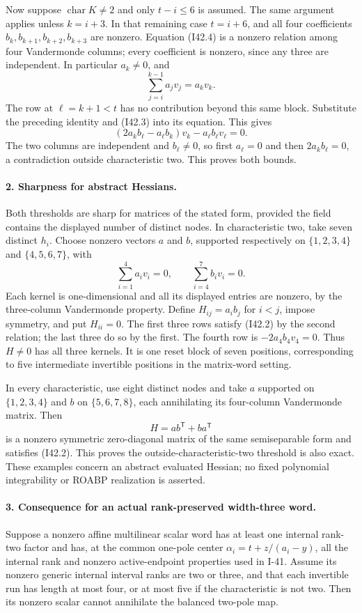 Now suppose $\operatorname{char}K\ne2$ and only $t-i\le6$
is assumed. The same argument applies unless $k=i+3$.
In that remaining case $t=i+6$, and all four coefficients
$b_k,b_{k+1},b_{k+2},b_{k+3}$ are nonzero. Equation (I42.4)
is a nonzero relation among four Vandermonde columns; every
coefficient is nonzero, since any three are independent.
In particular $a_k\ne0$, and
\[
 \sum_{j=i}^{k-1}a_jv_j=a_kv_k.
\]
The row at $\ell=k+1<t$ has no contribution beyond this same
block. Substitute the preceding identity and (I42.3) into its
equation. This gives
\[
 (2a_kb_\ell-a_\ell b_k)v_k-a_\ell b_\ell v_\ell=0.
 \tag{I42.5}
\]
The two columns are independent and $b_\ell\ne0$, so first
$a_\ell=0$ and then $2a_kb_\ell=0$, a contradiction outside
characteristic two. This proves both bounds.

\paragraph{2. Sharpness for abstract Hessians.}
Both thresholds are sharp for matrices of the stated form,
provided the field contains the displayed number of distinct
nodes. In characteristic two, take seven distinct $h_i$.
Choose nonzero vectors $a$ and $b$, supported respectively on
$\{1,2,3,4\}$ and $\{4,5,6,7\}$, with
\[
 \sum_{i=1}^4a_iv_i=0,
 \qquad\sum_{i=4}^7b_iv_i=0.
 \tag{I42.6}
\]
Each kernel is one-dimensional and all its displayed entries
are nonzero, by the three-column Vandermonde property. Define
$H_{ij}=a_ib_j$ for $i<j$, impose symmetry, and put $H_{ii}=0$.
The first three rows satisfy (I42.2) by the second relation;
the last three do so by the first. The fourth row is
$-2a_4b_4v_4=0$. Thus $H\ne0$ has all three kernels. It is
one reset block of seven positions, corresponding to five
intermediate invertible positions in the matrix-word setting.

In every characteristic, use eight distinct nodes and take
$a$ supported on $\{1,2,3,4\}$ and $b$ on
$\{5,6,7,8\}$, each annihilating its four-column Vandermonde
matrix. Then
\[
 H=ab^{\mathsf T}+ba^{\mathsf T}
 \tag{I42.7}
\]
is a nonzero symmetric zero-diagonal matrix of the same
semiseparable form and satisfies (I42.2). This proves the
outside-characteristic-two threshold is also exact. These
examples concern an abstract evaluated Hessian; no fixed
polynomial integrability or ROABP realization is asserted.

\paragraph{3. Consequence for an actual rank-preserved width-three word.}
Suppose a nonzero affine multilinear scalar word has at least
one internal rank-two factor and has, at the common
one-pole center $\alpha_i=t+z/(a_i-y)$, all the internal rank
and nonzero active-endpoint properties used in I-41. Assume
its nonzero generic internal interval ranks are two or three,
and that each invertible run has length at most four, or at
most five if the characteristic is not two. Then its nonzero
scalar cannot annihilate the balanced two-pole map.

